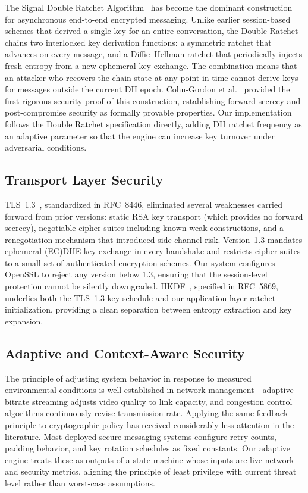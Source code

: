 \documentclass[conference]{IEEEtran}
\begin{document}
The Signal Double Ratchet Algorithm~\cite{b1} has become the dominant construction for
asynchronous end-to-end encrypted messaging. Unlike earlier session-based schemes that
derived a single key for an entire conversation, the Double Ratchet chains two
interlocked key derivation functions: a symmetric ratchet that advances on every message,
and a Diffie--Hellman ratchet that periodically injects fresh entropy from a new
ephemeral key exchange. The combination means that an attacker who recovers the chain
state at any point in time cannot derive keys for messages outside the current DH epoch.
Cohn-Gordon et al.~\cite{b2} provided the first rigorous security proof of this
construction, establishing forward secrecy and post-compromise security as formally
provable properties. Our implementation follows the Double Ratchet specification
directly, adding DH ratchet frequency as an adaptive parameter so that the engine can
increase key turnover under adversarial conditions.

\subsection{Transport Layer Security}

TLS~1.3~\cite{b3}, standardized in RFC~8446, eliminated several weaknesses carried
forward from prior versions: static RSA key transport (which provides no forward
secrecy), negotiable cipher suites including known-weak constructions, and a
renegotiation mechanism that introduced side-channel risk. Version~1.3 mandates
ephemeral (EC)DHE key exchange in every handshake and restricts cipher suites to a
small set of authenticated encryption schemes. Our system configures OpenSSL to reject
any version below 1.3, ensuring that the session-level protection cannot be silently
downgraded. HKDF~\cite{b4}, specified in RFC~5869, underlies both the TLS~1.3 key
schedule and our application-layer ratchet initialization, providing a clean separation
between entropy extraction and key expansion.

\subsection{Adaptive and Context-Aware Security}

The principle of adjusting system behavior in response to measured environmental
conditions is well established in network management—adaptive bitrate streaming adjusts
video quality to link capacity, and congestion control algorithms continuously revise
transmission rate. Applying the same feedback principle to cryptographic policy has
received considerably less attention in the literature. Most deployed secure messaging
systems configure retry counts, padding behavior, and key rotation schedules as fixed
constants. Our adaptive engine treats these as outputs of a state machine whose inputs
are live network and security metrics, aligning the principle of least privilege with
current threat level rather than worst-case assumptions.
\end{document}
